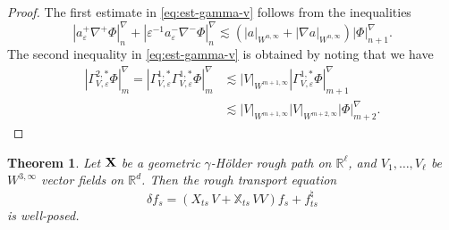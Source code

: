 \documentclass[11pt,a4paper]{amsart}
\newcommand{\RR}{\mathbb{R}}  \newcommand{\CC}{\mathbb{C}}  \newcommand{\LL}{\mathbb{L}}  \newcommand{\WW}{\mathbb{W}}
\newcommand{\bbX}{\mathbb{X}}
\theoremstyle{plain}%
\newtheorem{theorem}{Theorem}
\theoremstyle{definition}
\theoremstyle{remark}
\numberwithin{equation}{section} %
\begin{document}
\begin{proof}
The first estimate in \eqref{eq:est-gamma-v} follows from the inequalities
$$
| a^{+}_\varepsilon \nabla^{+} \Phi|^\nabla_{n}+| \varepsilon^{-1} a^{-}_\varepsilon \nabla^{-} \Phi|^\nabla_{n} \lesssim ( |a|_{W^{n,\infty}} + |\nabla a|_{W^{n,\infty}}) |\Phi|^\nabla_{n+1}.
$$ 
The second inequality in \eqref{eq:est-gamma-v} is obtained by noting that we have 
\begin{equation*}
\begin{split}
|\Gamma_{V,\varepsilon}^{2,\ast} \Phi|^\nabla_{m} =  |\Gamma_{V,\varepsilon}^{1,\ast}\Gamma_{V,\varepsilon}^{1,\ast} \Phi|^\nabla_{m} &\lesssim |V|_{W^{m+1,\infty}} |\Gamma_{V,\varepsilon}^{1,\ast} \Phi|^\nabla_{m+1} \\
&\lesssim |V|_{W^{m+1,\infty}} |V|_{W^{m+2,\infty}} | \Phi|^\nabla_{m+2}.
\end{split}
\end{equation*}

\end{proof}

\smallskip

\begin{theorem}
\label{ThmTransportL2}
Let ${\bf X}$ be a geometric $\gamma$-H\"older rough path on $\RR^\ell$, and $V_1,\dots,V_\ell$ be $W^{3,\infty}$ vector fields on $\RR^d$. Then the rough transport equation 
$$
\delta f_s = (X_{ts}\,V + \bbX_{ts}\,VV)f_s + f^\natural_{ts}
$$ 
is well-posed.
\end{theorem}

\smallskip
\end{document}
